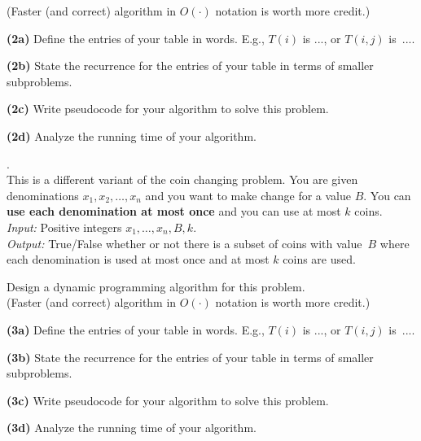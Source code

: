 \documentclass[12pt,twoside]{article}
\newcommand{\problem}[1]{\vspace{.1in} \noindent {\bf #1}.\\ }
\begin{document}
(Faster (and correct) algorithm in $O(\cdot)$ notation
is worth more credit.)  


{\bf (2a) } Define the entries of your table in words.  E.g., $T(i)$ is ..., or $T(i,j)$ is~....

\vspace{2in}

{\bf (2b) } State the recurrence for the entries of your table in
terms of smaller subproblems.

\newpage

{\bf (2c) } Write pseudocode for your algorithm to solve this problem.

\vspace{6in}

{\bf (2d) } Analyze the running time of your algorithm.


\newpage


\problem{3. Coin changing variant}

This is a different variant of the coin changing problem.
You are given denominations $x_1,x_2,\dots,x_n$ and you want
to make change for a value $B$.  You can {\bf use each denomination 
at most once }  and you can use at most $k$ coins.  \\
\hspace{.3in} {\em Input:} Positive integers $x_1,\dots,x_n, B, k$. \\
\hspace{.3in} {\em Output:} True/False whether or not there is a subset of
coins with value~$B$ where each denomination is used at most once
and at most $k$ coins are used.

Design a dynamic programming algorithm for this problem. \\
(Faster (and correct) algorithm in $O(\cdot)$ notation
is worth more credit.)  


{\bf (3a) } Define the entries of your table in words.  E.g., $T(i)$ is ..., or $T(i,j)$ is~....

\vspace{2in}

{\bf (3b) } State the recurrence for the entries of your table in
terms of smaller subproblems.

\newpage

{\bf (3c) } Write pseudocode for your algorithm to solve this problem.

\vspace{6in}

{\bf (3d) } Analyze the running time of your algorithm.

\newpage
\end{document}
